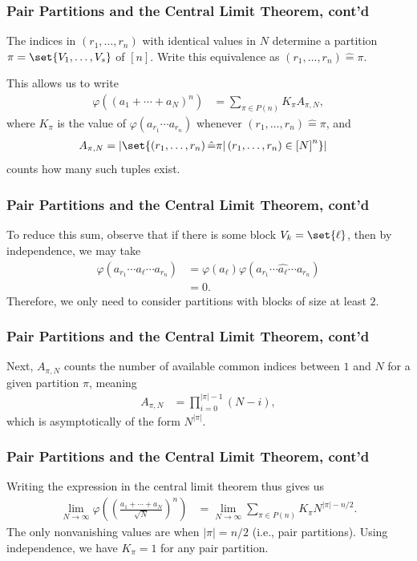 \documentclass{beamer}
\begin{document}
\begin{frame}
  \frametitle{Pair Partitions and the Central Limit Theorem, cont'd}
  The indices in $\left( r_1,\dots,r_n \right)$ with identical values in $N$ determine a partition $\pi = \set{V_1,\dots,V_s}$ of $\left[ n \right]$. Write this equivalence as $\left( r_1,\dots,r_n \right) \hat{=} \pi$.\newline\pause

  This allows us to write
  \begin{align*}
    \varphi\left( \left( a_1 + \cdots + a_N \right)^{n} \right) &= \sum_{\pi\in P(n)} K_{\pi}A_{\pi,N},
  \end{align*}
  where $K_{\pi}$ is the value of $\varphi\left( a_{r_1}\cdots a_{r_n} \right)$ whenever $\left( r_1,\dots,r_n \right) \hat{=}\pi$, and
  \begin{align*}
    A_{\pi,N} &= \left\vert \set{\left( r_1,\dots,r_n \right)\hat{=}\pi | \left( r_1,\dots,r_n \right)\in \left[ N \right]^{n}} \right\vert
  \end{align*}
  counts how many such tuples exist.
\end{frame}
\begin{frame}
  \frametitle{Pair Partitions and the Central Limit Theorem, cont'd}
  To reduce this sum, observe that if there is some block $V_k = \set{\ell}$, then by independence, we may take
  \begin{align*}
    \varphi\left( a_{r_1}\cdots a_{\ell}\cdots a_{r_n} \right) &= \varphi\left( a_{\ell} \right)\varphi\left( a_{r_1}\cdots\widehat{a_{\ell}}\cdots a_{r_n} \right)\\
                                                               &= 0.
  \end{align*}
  Therefore, we only need to consider partitions with blocks of size at least $2$.
\end{frame}
\begin{frame}
  \frametitle{Pair Partitions and the Central Limit Theorem, cont'd}
  Next, $A_{\pi,N}$ counts the number of available common indices between $1$ and $N$ for a given partition $\pi$, meaning
  \begin{align*}
    A_{\pi,N} &= \prod_{i=0}^{\left\vert \pi \right\vert-1} \left( N-i \right),
  \end{align*}
  which is asymptotically of the form $N^{\left\vert \pi \right\vert}$.
\end{frame}
\begin{frame}
  \frametitle{Pair Partitions and the Central Limit Theorem, cont'd}
  Writing the expression in the central limit theorem thus gives us
  \begin{align*}
    \lim_{N\rightarrow\infty} \varphi\left( \left( \frac{a_1 + \cdots + a_N}{\sqrt{N}} \right)^{n} \right) &= \lim_{N\rightarrow\infty}\sum_{\pi\in P(n)} K_{\pi} N^{\left\vert \pi \right\vert-n/2}.
  \end{align*}
  The only nonvanishing values are when $\left\vert \pi \right\vert = n/2$ (i.e., pair partitions). Using independence, we have $K_{\pi} = 1$ for any pair partition.
\end{frame}
\end{document}
